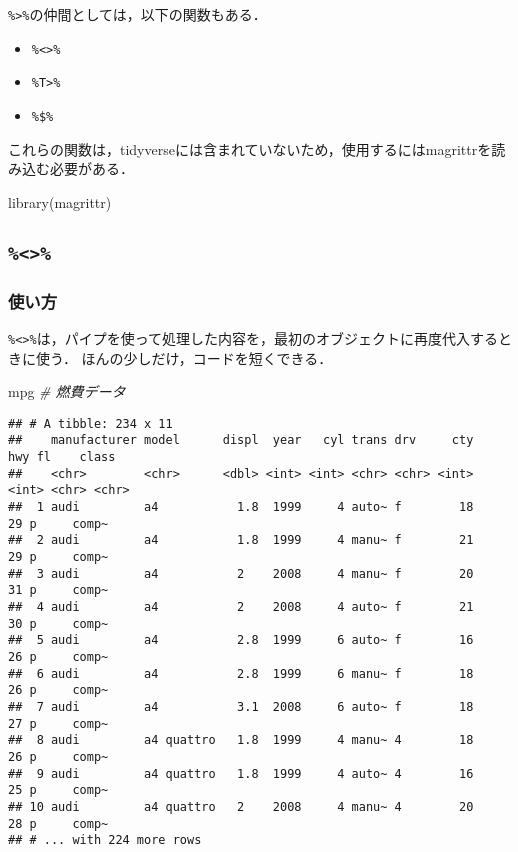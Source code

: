 \documentclass[
]{article}
\newenvironment{Shaded}{\begin{snugshade}}{\end{snugshade}}
\newcommand{\CommentTok}[1]{\textcolor[rgb]{0.56,0.35,0.01}{\textit{#1}}}
\newcommand{\FunctionTok}[1]{\textcolor[rgb]{0.00,0.00,0.00}{#1}}
\newcommand{\NormalTok}[1]{#1}
\providecommand{\tightlist}{%
  \setlength{\itemsep}{0pt}\setlength{\parskip}{0pt}}
\begin{document}
\texttt{\%\textgreater{}\%}の仲間としては，以下の関数もある．

\begin{itemize}
\tightlist
\item
  \texttt{\%\textless{}\textgreater{}\%}
\item
  \texttt{\%T\textgreater{}\%}
\item
  \texttt{\%\$\%}
\end{itemize}

これらの関数は，tidyverseには含まれていないため，使用するにはmagrittrを読み込む必要がある．

\begin{Shaded}
\begin{Highlighting}[]
\FunctionTok{library}\NormalTok{(magrittr)}
\end{Highlighting}
\end{Shaded}

\hypertarget{section}{%
\subsection{\texorpdfstring{\texttt{\%\textless{}\textgreater{}\%}}{\%\textless\textgreater\%}}\label{section}}

\hypertarget{ux4f7fux3044ux65b9}{%
\subsubsection{使い方}\label{ux4f7fux3044ux65b9}}

\texttt{\%\textless{}\textgreater{}\%}は，パイプを使って処理した内容を，最初のオブジェクトに再度代入するときに使う．
ほんの少しだけ，コードを短くできる．

\begin{Shaded}
\begin{Highlighting}[]
\NormalTok{mpg }\CommentTok{\# 燃費データ}
\end{Highlighting}
\end{Shaded}

\begin{verbatim}
## # A tibble: 234 x 11
##    manufacturer model      displ  year   cyl trans drv     cty   hwy fl    class
##    <chr>        <chr>      <dbl> <int> <int> <chr> <chr> <int> <int> <chr> <chr>
##  1 audi         a4           1.8  1999     4 auto~ f        18    29 p     comp~
##  2 audi         a4           1.8  1999     4 manu~ f        21    29 p     comp~
##  3 audi         a4           2    2008     4 manu~ f        20    31 p     comp~
##  4 audi         a4           2    2008     4 auto~ f        21    30 p     comp~
##  5 audi         a4           2.8  1999     6 auto~ f        16    26 p     comp~
##  6 audi         a4           2.8  1999     6 manu~ f        18    26 p     comp~
##  7 audi         a4           3.1  2008     6 auto~ f        18    27 p     comp~
##  8 audi         a4 quattro   1.8  1999     4 manu~ 4        18    26 p     comp~
##  9 audi         a4 quattro   1.8  1999     4 auto~ 4        16    25 p     comp~
## 10 audi         a4 quattro   2    2008     4 manu~ 4        20    28 p     comp~
## # ... with 224 more rows
\end{verbatim}
\end{document}
